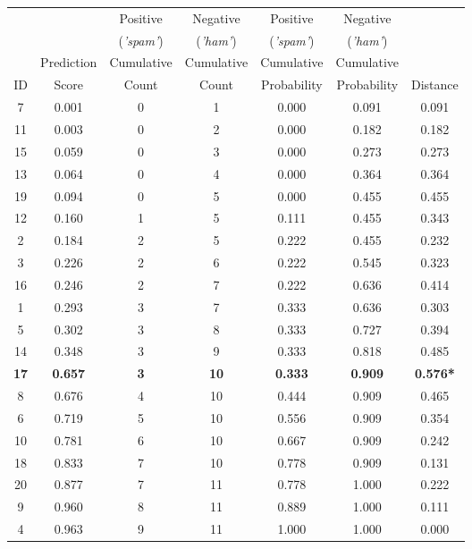 \documentclass[xcolor={table}]{beamer}
\newcommand{\featN}[1]{\textsc{#1}}
\newcommand{\featL}[1]{\textit{'#1'}}
\begin{document}
\begin{frame} [plain]
\begin{table}[!htb]
\label{tab:ksStatExampleWorkings}
\centering
\begin{scriptsize}
\begin{tabular}{  c  c  c  c  c  c  c }
\hline
~	&	~		& Positive	&	Negative	&	Positive 	&	Negative	 &	~	\\
~	&	~	 & 	(\featL{spam})	&	(\featL{ham})	&	(\featL{spam}) 	&	(\featL{ham})	 &	~	\\
~	&	Prediction	& Cumulative	&	Cumulative	&	Cumulative 	&	Cumulative	 &	~	\\
\featN{ID}	&	Score	 &	Count	&	Count	&	Probability 	& Probability	 &	Distance	\\
\hline
7	&	0.001 & 0	&	1	&	0.000	&	0.091	&	0.091	\\
11	&	0.003 & 	0	&	2	&	0.000	&	0.182	&	0.182	\\
15	&	0.059 & 	0	&	3	&	0.000	&	0.273	&	0.273	\\
13	&	0.064 & 	0	&	4	&	0.000	&	0.364	&	0.364	\\
19	&	0.094 & 	0	&	5	&	0.000	&	0.455	&	0.455	\\
12	&	0.160 & 	1	&	5	&	0.111	&	0.455	&	0.343	\\
2	&	0.184 & 	2	&	5	&	0.222	&	0.455	&	0.232	\\
3	&	0.226 & 	2	&	6	&	0.222	&	0.545	&	0.323	\\
16	&	0.246 & 	2	&	7	&	0.222	&	0.636	&	0.414	\\
1	&	0.293 & 	3	&	7	&	0.333	&	0.636	&	0.303	\\
5	&	0.302 & 	3	&	8	&	0.333	&	0.727	&	0.394	\\
14	&	0.348 & 	3	&	9	&	0.333	&	0.818	&	0.485	\\
\textbf{17}	&	\textbf{0.657} & 	\textbf{3}	&	\textbf{10}	&	\textbf{0.333}	&	\textbf{0.909}	&	\textbf{0.576*}	\\
8	&	0.676 & 	4	&	10	&	0.444	&	0.909	&	0.465	\\
6	&	0.719 & 	5	&	10	&	0.556	&	0.909	&	0.354	\\
10	&	0.781 & 	6	&	10	&	0.667	&	0.909	&	0.242	\\
18	&	0.833 & 	7	&	10	&	0.778	&	0.909	&	0.131	\\
20	&	0.877 & 	7	&	11	&	0.778	&	1.000	&	0.222	\\
9	&	0.960 & 	8	&	11	&	0.889	&	1.000	&	0.111	\\
4	&	0.963 & 	9	&	11	&	1.000	&	1.000	&	0.000	\\
\hline
\end{tabular}
\end{scriptsize}
\end{table}
\end{frame} 
\end{document}
